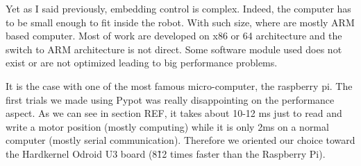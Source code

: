 Yet as I said previously, embedding control is complex. Indeed, the computer has to be small enough to fit inside the robot. With such size, where are mostly ARM based computer. Most of work are developed on x86 or 64 architecture and the switch to ARM architecture is not direct. Some software module used does not exist or are not optimized leading to big performance problems.

It is the case with one of the most famous micro-computer, the raspberry pi. The first trials we made using Pypot was really disappointing on the performance aspect. As we can see in section REF, it takes about 10-12 ms just to read and write a motor position (mostly computing) while it is only 2ms on a normal computer (mostly serial communication). Therefore we oriented our choice toward the Hardkernel Odroid U3 board (8\~12 times faster than the Raspberry Pi).

